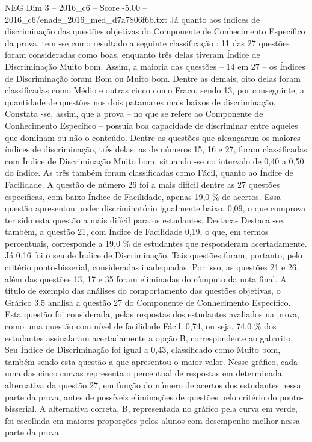 \begin{textsample}{NEG Dim 3 – 2016\_c6 – Score -5.00 – 2016\_c6/enade\_2016\_med\_d7a7806f6b.txt}
Já quanto aos índices de discriminação das questões objetivas do Componente de Conhecimento Específico da prova, tem -se como resultado a seguinte classificação : 11 das 27 questões foram consideradas como boas, enquanto três delas tiveram Índice de Discriminação Muito bom.
Assim, a maioria das questões – 14 em 27 – os Índices de Discriminação foram Bom ou Muito bom.
Dentre as demais, oito delas foram classificadas como Médio e outras cinco como Fraco, sendo 13, por conseguinte, a quantidade de questões nos dois patamares mais baixos de discriminação.
Constata -se, assim, que a prova – no que se refere ao Componente de Conhecimento Específico – possuía boa capacidade de discriminar entre aqueles que dominam ou não o conteúdo.
Dentre as questões que alcançaram os maiores índices de discriminação, três delas, as de números 15, 16 e 27, foram classificadas com Índice de Discriminação Muito bom, situando -se no intervalo de 0,40 a 0,50 do índice.
As três também foram classificadas como Fácil, quanto ao Índice de Facilidade.
A questão de número 26 foi a mais difícil dentre as 27 questões específicas, com baixo Índice de Facilidade, apenas 19,0 \% de acertos.
Essa questão apresentou poder discriminatório igualmente baixo, 0,09, o que comprova ter sido esta questão a mais difícil para os estudantes.
Destaca- Destaca -se, também, a questão 21, com Índice de Facilidade 0,19, o que, em termos percentuais, corresponde a 19,0 \% de estudantes que responderam acertadamente.
Já 0,16 foi o seu de Índice de Discriminação.
Tais questões foram, portanto, pelo critério ponto-bisserial, consideradas inadequadas.
Por isso, as questões 21 e 26, além das questões 13, 17 e 35 foram eliminadas do cômputo da nota final.
A título de exemplo das análises do comportamento das questões objetivas, o Gráfico 3.5 analisa a questão 27 do Componente de Conhecimento Específico.
Esta questão foi considerada, pelas respostas dos estudantes avaliados na prova, como uma questão com nível de facilidade Fácil, 0,74, ou seja, 74,0 \% dos estudantes assinalaram acertadamente a opção B, correspondente ao gabarito.
Seu Índice de Discriminação foi igual a 0,43, classificado como Muito bom, também sendo esta questão a que apresentou o maior valor.
Nesse gráfico, cada uma das cinco curvas representa o percentual de respostas em determinada alternativa da questão 27, em função do número de acertos dos estudantes nessa parte da prova, antes de possíveis eliminações de questões pelo critério do ponto-bisserial.
A alternativa correta, B, representada no gráfico pela curva em verde, foi escolhida em maiores proporções pelos alunos com desempenho melhor nessa parte da prova.

\end{textsample}
